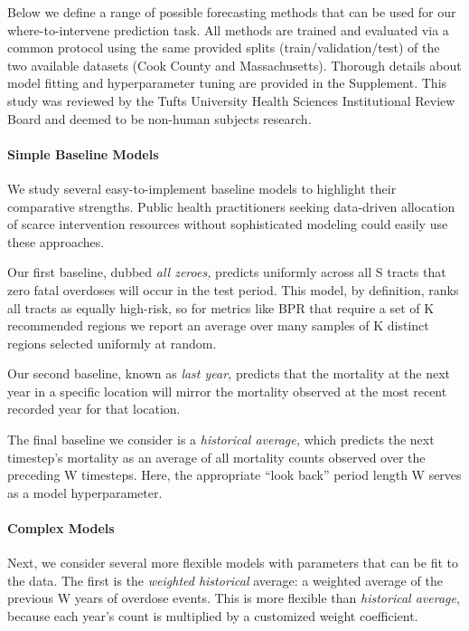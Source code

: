 Below we define a range of possible forecasting methods that can be used for our where-to-intervene prediction task. All methods are trained and evaluated via a common protocol using the same provided splits (train/validation/test) of the two available datasets (Cook County and Massachusetts). Thorough details about model fitting and hyperparameter tuning are provided in the Supplement. This study was reviewed by the Tufts University Health Sciences Institutional Review Board and deemed to be non-human subjects research.

\paragraph{Simple Baseline Models}\label{simple-baseline-models}

We study several easy-to-implement baseline models to highlight their comparative strengths. Public health practitioners seeking data-driven allocation of scarce intervention resources without sophisticated modeling could easily use these approaches.

Our first baseline, dubbed \emph{all zeroes,} predicts uniformly across all S tracts that zero fatal overdoses will occur in the test period. This model, by definition, ranks all tracts as equally high-risk, so for metrics like BPR that require a set of K recommended regions we report an average over many samples of K distinct regions selected uniformly at random.

Our second baseline, known as \emph{last year,} predicts that the mortality at the next year in a specific location will mirror the mortality observed at the most recent recorded year for that location.

The final baseline we consider is a \emph{historical average,} which predicts the next timestep's mortality as an average of all mortality counts observed over the preceding W timesteps. Here, the appropriate ``look back'' period length W serves as a model hyperparameter.

\paragraph{Complex Models}\label{complex-models}

Next, we consider several more flexible models with parameters that can be fit to the data. The first is the \emph{weighted historical} average: a weighted average of the previous W years of overdose events. This is more flexible than \emph{historical average}, because each year's count is multiplied by a customized weight coefficient.

